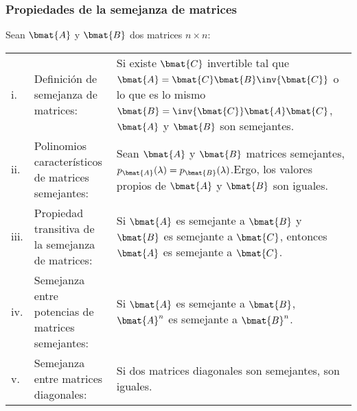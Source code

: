 \documentclass{fmbnotes}
\begin{document}
\subsubsection{Propiedades de la semejanza de matrices}
Sean \(\bmat{A}\) y \(\bmat{B}\) dos matrices \(n\times n\):
\begin{longtable}{lp{}p{}}
	\rule[1ex]{0pt}{2.5ex}i.&Definición de semejanza de matrices: &Si existe \(\bmat{C}\) invertible tal que \(\bmat{A}=\bmat{C}\bmat{B}\inv{\bmat{C}}\) o lo que es lo mismo \( \bmat{B}=\inv{\bmat{C}}\bmat{A}\bmat{C} \), \(\bmat{A}\) y \(\bmat{B}\) son semejantes. \\
	\rule[1ex]{0pt}{2.5ex}ii.&Polinomios característicos de matrices semejantes: &Sean \(\bmat{A}\) y \(\bmat{B}\) matrices semejantes, \( p_{\bmat{A}}(\lambda) = p_{\bmat{B}}(\lambda)\).\newline Ergo, los valores propios de \(\bmat{A}\) y \(\bmat{B}\) son iguales. \\
	\rule[1ex]{0pt}{2.5ex}iii.&Propiedad transitiva de la semejanza de matrices: &Si \(\bmat{A}\) es semejante a \(\bmat{B}\) y \(\bmat{B}\) es semejante a \(\bmat{C}\), entonces \(\bmat{A}\) es semejante a \(\bmat{C}\). \\
	\rule[1ex]{0pt}{2.5ex}iv.&Semejanza entre potencias de matrices semejantes: &Si \(\bmat{A}\) es semejante a \(\bmat{B}\), \(\bmat{A}^n\) es semejante a \(\bmat{B}^n\).  \\
	\rule[1ex]{0pt}{2.5ex}v.&Semejanza entre matrices diagonales: &Si dos matrices diagonales son semejantes, son iguales. \\
\end{longtable}
\end{document}
